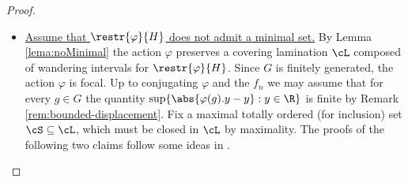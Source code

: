 \documentclass[reqno]{amsart}
\begin{document}
\begin{proof}
\begin{itemize}
We claim that $\varphi(h).y < \varphi(g).y$ for all $y \geq \varphi(h^N).0$. Indeed, write $y = \varphi(h^n).t$ where $n \geq N$ and $t \in [0, \varphi(h).0]$. Denote by $\nu$ a Radon measure on $\R$ such that $\tau = \tau_\nu$ as in \eqref{eq:defTau}. Take $k=k(n,t) \in \Z$ such that
\begin{equation} \label{eq:k}
        \varphi(g^{-1}h^{k-1} g).t \leq \varphi(h^n).t < \varphi(g^{-1}h^{k}g).t. 
\end{equation}
Then
\[
	n\tau(h) = \nu[t, \varphi(h^n).t) \leq \nu[t, \varphi(g^{-1}h^{k} g).t) = \tau \circ \triangle(g^{-1})(h^{k}) = k\kappa(g^{-1})\tau(h).
\]
We conclude that $k \geq \kappa(g)n - 1 \geq n + r$ because $n \geq N$, and \eqref{eq:k} implies
\[
        \varphi(g).y = \varphi(gh^n).t \geq \varphi(h^{k-1}g).t \geq \varphi(h^{n+r}g).t > \varphi(h^{n+1}).t = \varphi(h).y
\] as desired.

Since $\lim_{n \to \infty} f_n^{-1}(x) = \infty$ we deduce that $f_n.\varphi \not \in U$ for sufficiently large $n \in \N$, which contradicts the assumption that $\lim_{n \to \infty} f_n.\varphi = \varphi$.

	\item \underline{Assume that $\restr{\varphi}{H}$ does not admit a minimal set.} By Lemma \ref{lema:noMinimal} the action $\varphi$ preserves a covering lamination $\cL$ composed of wandering intervals for $\restr{\varphi}{H}$. Since $G$ is finitely generated, the action $\varphi$ is focal. Up to conjugating $\varphi$ and the $f_n$ we may assume that for every $g \in G$ the quantity $\sup\{ \abs{\varphi(g).y - y} : y \in \R\}$ is finite by Remark \ref{rem:bounded-displacement}. %
	Fix a maximal totally ordered (for inclusion) set $\cS \subseteq \cL$, which must be closed in $\cL$ by maximality. The proofs of the following two claims follow some ideas in \cite[Section 15.1]{BMRT}.%


\end{itemize}
\end{proof}
\end{document}
